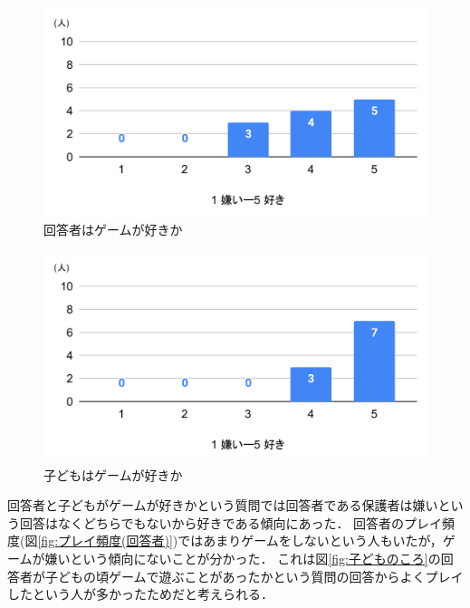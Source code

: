 \documentclass[12pt,a4j,titlepage]{ltjsarticle}
\begin{document}
\begin{figure}[H]
 \begin{center}
  \includegraphics[keepaspectratio, scale=0.5]{chart4.pdf}
 \end{center}
 \caption{回答者はゲームが好きか}
 \label{fig:好き嫌い(回答者)}
\end{figure}

\begin{figure}[H]
 \begin{center}
  \includegraphics[keepaspectratio, scale=0.5]{chart5.pdf}
 \end{center}
 \caption{子どもはゲームが好きか}
 \label{fig:好き嫌い(子ども)}
\end{figure}

回答者と子どもがゲームが好きかという質問では回答者である保護者は嫌いという回答はなくどちらでもないから好きである傾向にあった．
回答者のプレイ頻度(図\ref{fig:プレイ頻度(回答者)})ではあまりゲームをしないという人もいたが，ゲームが嫌いという傾向にないことが分かった．
これは図\ref{fig:子どものころ}の回答者が子どもの頃ゲームで遊ぶことがあったかという質問の回答からよくプレイしたという人が多かったためだと考えられる．
\end{document}
